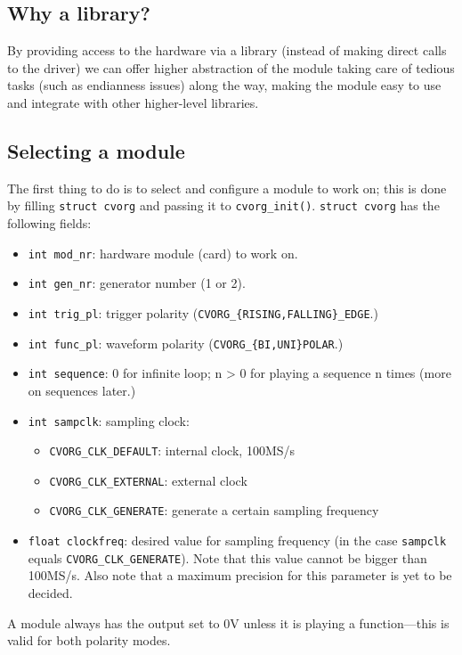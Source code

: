 \documentclass[12pt,a4paper]{article}
\begin{document}
\subsection*{Why a library?}
\label{sec-2.2}

  By providing access to the hardware via a library (instead of making direct
  calls to the driver) we can offer higher abstraction of the module taking
  care of tedious tasks (such as endianness issues) along the way, making
  the module easy to use and integrate with other higher-level libraries.

\subsection*{Selecting a module}
\label{sec-2.3}

  The first thing to do is to select and configure a module to work on;
  this is done by filling \verb~struct cvorg~ and passing it to \verb~cvorg_init()~.
  \verb~struct cvorg~ has the following fields:
\begin{itemize}
\item \verb~int mod_nr~: hardware module (card) to work on.
\item \verb~int gen_nr~: generator number (1 or 2).
\item \verb~int trig_pl~: trigger polarity (\verb~CVORG_{RISING,FALLING}_EDGE~.)
\item \verb~int func_pl~: waveform polarity (\verb~CVORG_{BI,UNI}POLAR~.)
\item \verb~int sequence~: 0 for infinite loop; n > 0 for playing a sequence n times
    (more on sequences later.)
\item \verb~int sampclk~: sampling clock:

\begin{itemize}
\item \verb~CVORG_CLK_DEFAULT~: internal clock, 100MS/s
\item \verb~CVORG_CLK_EXTERNAL~: external clock
\item \verb~CVORG_CLK_GENERATE~: generate a certain sampling frequency
\end{itemize}

\item \verb~float clockfreq~: desired value for sampling frequency (in the case
    \verb~sampclk~ equals \verb~CVORG_CLK_GENERATE~). Note that this value cannot be
    bigger than 100MS/s. Also note that a maximum precision for this parameter
    is yet to be decided.
\end{itemize}
  A module always has the output set to 0V unless it is playing a
  function---this is valid for both polarity modes.
\end{document}
